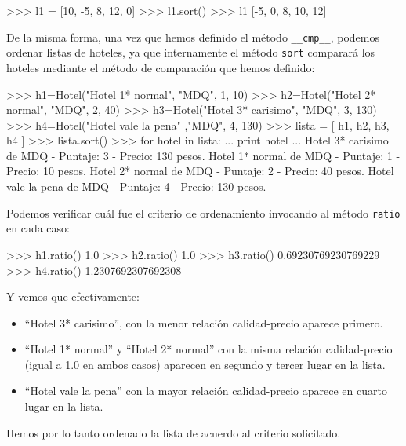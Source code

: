 \begin{codigo-python-sn}
>>> l1 = [10, -5, 8, 12, 0]
>>> l1.sort()
>>> l1
[-5, 0, 8, 10, 12]
\end{codigo-python-sn}

De la misma forma, una vez que hemos definido el método
\lstinline!__cmp__!, podemos ordenar listas de hoteles, ya que
internamente el método \lstinline!sort! comparará los hoteles mediante
el método de comparación que hemos definido:

\begin{codigo-python-sn}
>>> h1=Hotel("Hotel 1* normal", "MDQ", 1, 10)
>>> h2=Hotel("Hotel 2* normal", "MDQ", 2, 40)
>>> h3=Hotel("Hotel 3* carisimo", "MDQ", 3, 130)
>>> h4=Hotel("Hotel vale la pena" ,"MDQ", 4, 130)
>>> lista = [ h1, h2, h3, h4 ]
>>> lista.sort()
>>> for hotel in lista:
...     print hotel
...
Hotel 3* carisimo de MDQ - Puntaje: 3 - Precio: 130 pesos.
Hotel 1* normal de MDQ - Puntaje: 1 - Precio: 10 pesos.
Hotel 2* normal de MDQ - Puntaje: 2 - Precio: 40 pesos.
Hotel vale la pena de MDQ - Puntaje: 4 - Precio: 130 pesos.
\end{codigo-python-sn}

Podemos verificar cuál fue el criterio de ordenamiento invocando al
método \lstinline!ratio! en cada caso:

\begin{codigo-python-sn}
>>> h1.ratio()
1.0
>>> h2.ratio()
1.0
>>> h3.ratio()
0.69230769230769229
>>> h4.ratio()
1.2307692307692308
\end{codigo-python-sn}

Y vemos que efectivamente:

\begin{itemize}
\item ``Hotel 3* carisimo'', con la menor relación calidad-precio
aparece primero.

\item ``Hotel 1* normal'' y ``Hotel 2* normal'' con la misma relación
calidad-precio (igual a 1.0 en ambos casos) aparecen en segundo
y tercer lugar en la lista.

\item ``Hotel vale la pena'' con la mayor relación calidad-precio
aparece en cuarto lugar en la lista.
\end{itemize}

Hemos por lo tanto ordenado la lista de acuerdo al criterio solicitado.

%
%
%
%
%

